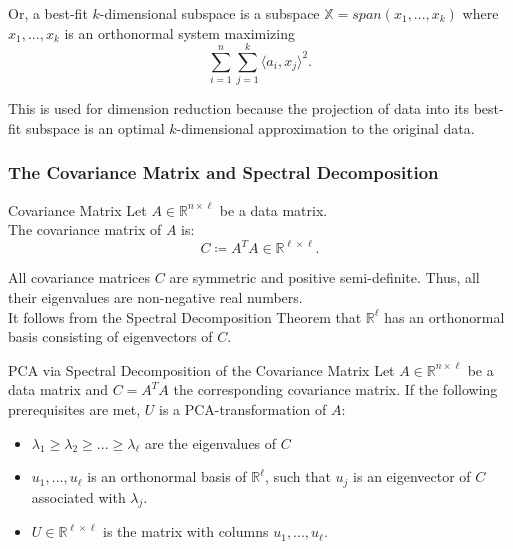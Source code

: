 \documentclass[english]{panikzettel}
\begin{document}
\begin{halfboxl}
\vspace{-\baselineskip}
Or, a best-fit $k$-dimensional subspace is a subspace $\mathbb{X} = span(x_1,...,x_k)$ where $x_1,...,x_k$ is an orthonormal system maximizing
\[
\sum_{i=1}^n\sum_{j=1}^k \langle a_i, x_j\rangle^2.
\]
\end{halfboxl}
\begin{halfboxr}
\vspace{-\baselineskip}
This is used for dimension reduction because the projection of data into its best-fit subspace is an optimal $k$-dimensional approximation to the original data.
\end{halfboxr}

\subsubsection{The Covariance Matrix and Spectral Decomposition}
\begin{halfboxl}
\vspace{-\baselineskip}
	\begin{defi}{Covariance Matrix}
		Let $A\in\mathbb{R}^{n\times \ell}$ be a data matrix. \\
		The covariance matrix of $A$ is:
		\[
		C\coloneqq A^TA\in\mathbb{R}^{\ell\times\ell}.
		\]
	\end{defi}
\end{halfboxl}
\begin{halfboxr}
\vspace{-\baselineskip}
	All covariance matrices $C$ are symmetric and positive semi-definite. Thus, all their eigenvalues are non-negative real numbers.\\
	It follows from the Spectral Decomposition Theorem that $\mathbb{R}^\ell$ has an orthonormal basis consisting of eigenvectors of $C$.
\end{halfboxr}

\begin{theo}{PCA via Spectral Decomposition of the Covariance Matrix}
Let $A\in \mathbb{R}^{n\times \ell}$ be a data matrix and $C=A^TA$ the corresponding covariance matrix.
If the following prerequisites are met, $U$ is a PCA-transformation of $A$:
\begin{itemize}
	\item $\lambda_1\geq \lambda_2 \geq ...\geq \lambda_\ell$ are the eigenvalues of $C$
	\item $u_1,...,u_\ell$ is an orthonormal basis of $\mathbb{R}^\ell$, such that $u_j$ is an eigenvector of $C$ associated with $\lambda_j$.
	\item $U\in\mathbb{R}^{\ell\times\ell}$ is the matrix with columns $u_1,...,u_\ell$.
\end{itemize}
\end{theo}
\end{document}
